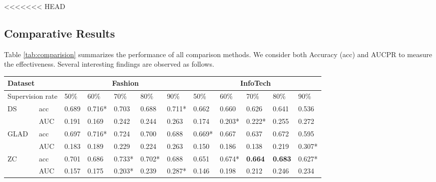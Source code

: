 <<<<<<< HEAD
\subsection{Comparative Results}
Table \ref{tab:comparision} summarizes the performance of all comparison methods. We consider both Accuracy (acc)
and AUCPR to measure the effectiveness. Several interesting findings are observed as follows.
\begin{table*}[!h]
\centering
\begin{tabular}{|l|l|l|l|l|l|l|l|l|l|l|l|}
\hline
\multicolumn{2}{|l|}{Dataset}          & \multicolumn{5}{c|}{Fashion}                                                       & \multicolumn{5}{c|}{InfoTech}                                                            \\ \hline
\multicolumn{2}{|l|}{Supervision rate} & 50\%           & 60\%           & 70\%           & 80\%           & 90\%           & 50\%           & 60\%           & 70\%           & 80\%           & 90\%           \\ \hline
\multirow{2}{*}{DS}          & acc     & 0.689          & 0.716*         & 0.703          & 0.688          & 0.711*         & 0.662          & 0.660          & 0.626          & 0.641          & 0.536          \\ \cline{2-12} 
                             & AUC   & 0.191          & 0.169          & 0.242          & 0.244          & 0.263          & 0.174          & 0.203*         & 0.222*         & 0.255          & 0.272          \\ \hline
\multirow{2}{*}{GLAD}        & acc     & 0.697          & 0.716*         & 0.724          & 0.700          & 0.688          & 0.669*         & 0.667          & 0.637          & 0.672          & 0.595          \\ \cline{2-12} 
                             & AUC   & 0.183          & 0.189          & 0.229          & 0.224          & 0.263          & 0.150          & 0.186          & 0.138          & 0.219          & 0.307*         \\ \hline
ZC                           & acc     & 0.701          & 0.686          & 0.733* & 0.702*         & 0.688          & 0.651          & 0.674*         & \textbf{0.664} & \textbf{0.683} & 0.627*         \\ \cline{2-12} 
                             & AUC   & 0.157          & 0.175          & 0.203*         & 0.239          & 0.287*         & 0.146          & 0.198          & 0.212          & 0.246          & 0.234          \\ \hline

\end{tabular}
\end{table*}
